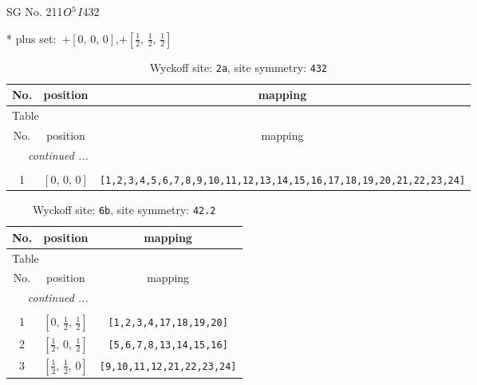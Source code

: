 \documentclass[fleqn,8pt]{jsarticle}
\begin{document}
\setcounter{MaxMatrixCols}{32}

\renewcommand{\tablename}{Table~}
\renewcommand{\figurename}{Figure~}
\begin{center}
\LARGE
SG No. 211\quad$O_{\rm }^{5}$\quad$I432$\quad[ cubic ]
\end{center}
* plus set:\,\,\,$+\left[ 0,\, 0,\, 0 \right]$,\quad $+\left[ \frac{1}{2},\, \frac{1}{2},\, \frac{1}{2} \right]$
\renewcommand{\arraystretch}{1.2}
\begin{longtable}{ccc}
\caption{Wyckoff site: {\tt 2a}, site symmetry: {\tt 432}}
 \\
 \hline \hline
No. & position & mapping \\ \hline \endfirsthead

\multicolumn{2}{l}{\tablename\ \thetable{}} \\
 \hline \hline
No. & position & mapping \\ \hline \endhead

 \hline \hline
\multicolumn{2}{r}{\footnotesize\it continued ...} \\ \endfoot

 \hline \hline
\multicolumn{2}{r}{} \\ \endlastfoot

1 & $\left[ 0,\, 0,\, 0 \right]$ & {\tt [1,2,3,4,5,6,7,8,9,10,11,12,13,14,15,16,17,18,19,20,21,22,23,24]} \\
\end{longtable}
\renewcommand{\arraystretch}{1.2}
\begin{longtable}{ccc}
\caption{Wyckoff site: {\tt 6b}, site symmetry: {\tt 42.2}}
 \\
 \hline \hline
No. & position & mapping \\ \hline \endfirsthead

\multicolumn{2}{l}{\tablename\ \thetable{}} \\
 \hline \hline
No. & position & mapping \\ \hline \endhead

 \hline \hline
\multicolumn{2}{r}{\footnotesize\it continued ...} \\ \endfoot

 \hline \hline
\multicolumn{2}{r}{} \\ \endlastfoot

1 & $\left[ 0,\, \frac{1}{2},\, \frac{1}{2} \right]$ & {\tt [1,2,3,4,17,18,19,20]} \\ \hline
2 & $\left[ \frac{1}{2},\, 0,\, \frac{1}{2} \right]$ & {\tt [5,6,7,8,13,14,15,16]} \\ \hline
3 & $\left[ \frac{1}{2},\, \frac{1}{2},\, 0 \right]$ & {\tt [9,10,11,12,21,22,23,24]} \\
\end{longtable}
\end{document}
